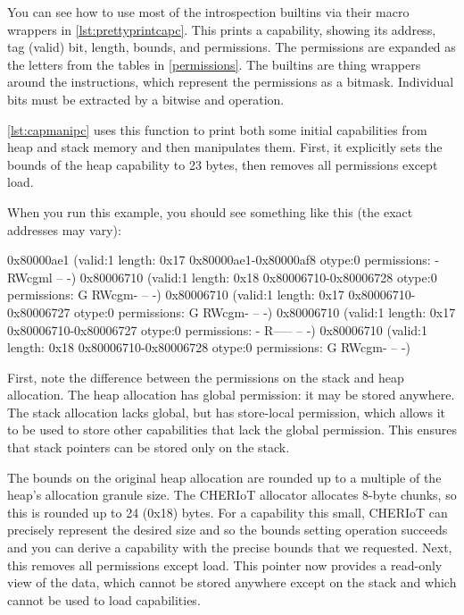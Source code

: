 {{{{{{{{You can see how to use most of the introspection builtins via their macro wrappers in \ref{lst:prettyprintcapc}.
This prints a capability, showing its address, tag (valid) bit, length, bounds, and permissions.
The permissions are expanded as the letters from the tables in \ref{permissions}.
The builtins are thing wrappers around the instructions, which represent the permissions as a bitmask.
Individual bits must be extracted by a bitwise and operation.

\codelisting[filename=examples/manipulate_capabilities_c/example.c,marker=print_capability,label=lst:prettyprintcapc,caption="Pretty printing a capability using the C builtin wrappers."]{}

\ref{lst:capmanipc} uses this function to print both some initial capabilities from heap and stack memory and then manipulates them.
First, it explicitly sets the bounds of the heap capability to 23 bytes, then removes all permissions except load.

\codelisting[filename=examples/manipulate_capabilities_c/example.c,marker=capability_manipulation,label=lst:capmanipc,caption="Manipulating capabilities using the C builtin wrappers."]{}

When you run this example, you should see something like this (the exact addresses may vary):

\begin{console}
0x80000ae1 (valid:1 length: 0x17 0x80000ae1-0x80000af8 otype:0 permissions: - RWcgml -- -)
0x80006710 (valid:1 length: 0x18 0x80006710-0x80006728 otype:0 permissions: G RWcgm- -- -)
0x80006710 (valid:1 length: 0x17 0x80006710-0x80006727 otype:0 permissions: G RWcgm- -- -)
0x80006710 (valid:1 length: 0x17 0x80006710-0x80006727 otype:0 permissions: - R----- -- -)
0x80006710 (valid:1 length: 0x18 0x80006710-0x80006728 otype:0 permissions: G RWcgm- -- -)
\end{console}

First, note the difference between the permissions on the stack and heap allocation.
The heap allocation has global permission: it may be stored anywhere.
The stack allocation lacks global, but has store-local permission, which allows it to be used to store other capabilities that lack the global permission.
This ensures that stack pointers can be stored only on the stack.

The bounds on the original heap allocation are rounded up to a multiple of the heap's allocation granule size.
The CHERIoT allocator allocates 8-byte chunks, so this is rounded up to 24 (0x18) bytes.
For a capability this small, CHERIoT can precisely represent the desired size and so the bounds setting operation succeeds and you can derive a capability with the precise bounds that we requested.
Next, this removes all permissions except load.
This pointer now provides a read-only view of the data, which cannot be stored anywhere except on the stack and which cannot be used to load capabilities.

}}}}}}}}
